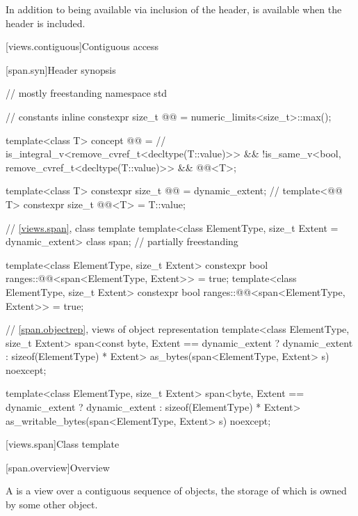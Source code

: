 \pnum
In addition to being available via inclusion of the  header,
 is available when the header  is included.

[views.contiguous]{Contiguous access}

[span.syn]{Header  synopsis}%

%
\begin{codeblock}
// mostly freestanding
namespace std {
  // constants
  inline constexpr size_t @@ = numeric_limits<size_t>::max();

  template<class T>
    concept @@ =                    // \expos
      is_integral_v<remove_cvref_t<decltype(T::value)>> &&
      !is_same_v<bool, remove_cvref_t<decltype(T::value)>> &&
      @@<T>;

  template<class T>
    constexpr size_t @@ = dynamic_extent; // \expos
  template<@@ T>
    constexpr size_t @@<T> = {T::value};

  // \ref{views.span}, class template 
  template<class ElementType, size_t Extent = dynamic_extent>
    class span;                                                             // partially freestanding

  template<class ElementType, size_t Extent>
    constexpr bool ranges::@@<span<ElementType, Extent>> = true;
  template<class ElementType, size_t Extent>
    constexpr bool ranges::@@<span<ElementType, Extent>> = true;

  // \ref{span.objectrep}, views of object representation
  template<class ElementType, size_t Extent>
    span<const byte, Extent == dynamic_extent ? dynamic_extent : sizeof(ElementType) * Extent>
      as_bytes(span<ElementType, Extent> s) noexcept;

  template<class ElementType, size_t Extent>
    span<byte, Extent == dynamic_extent ? dynamic_extent : sizeof(ElementType) * Extent>
      as_writable_bytes(span<ElementType, Extent> s) noexcept;
}
\end{codeblock}

[views.span]{Class template }

[span.overview]{Overview}

\pnum
{}%
A  is a view over a contiguous sequence of objects,
the storage of which is owned by some other object.

